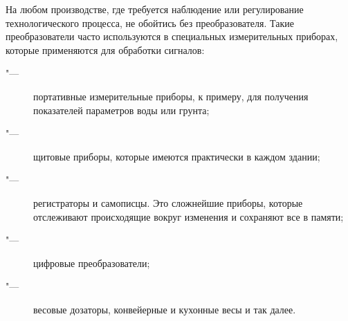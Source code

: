 \documentclass{article}
\begin{document}
На любом производстве, где требуется наблюдение или регулирование
технологического процесса, не обойтись без преобразователя. Такие
преобразователи часто используются в специальных измерительных приборах, которые
применяются для обработки сигналов:
\begin{description}
  \item["---] портативные измерительные приборы, к примеру, для получения
    показателей параметров воды или грунта;
  \item["---] щитовые приборы, которые имеются практически в каждом здании;
  \item["---] регистраторы и самописцы. Это сложнейшие приборы, которые
    отслеживают происходящие вокруг изменения и сохраняют все в памяти;
  \item["---] цифровые преобразователи;
  \item["---] весовые дозаторы, конвейерные и кухонные весы и так далее.
\end{description}
\end{document}
